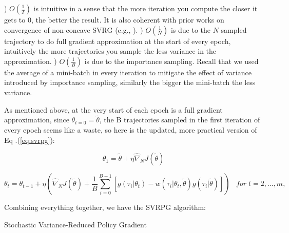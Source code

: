 ) $O(\frac{1}{T})$ is intuitive in a sense that the more iteration you compute the closer it gets to 0, the better the result. It is also coherent with prior works on convergence of non-concave SVRG (e.g., \cite{reddi2016stochastic}). ) $O(\frac{1}{N})$ is due to the $N$ sampled trajectory to do full gradient approximation at the start of every epoch, intuitively the more trajectories you sample the less variance in the approximation. ) $O(\frac{1}{B})$ is due to the importance sampling. Recall that we used the average of a mini-batch in every iteration to mitigate the effect of variance introduced by importance sampling, similarly the bigger the mini-batch the less variance.


As mentioned above, at the very start of each epoch is a full gradient approximation, since $\theta_{t=0} = \tilde{\theta}$, the B trajectories sampled in the first iteration of every epoch seems like a waste, so here is the updated, more practical version of Eq .(\ref{eq:svrpg}):

$$\theta_1 = \tilde{\theta}+\eta\widehat{\nabla}_N J(\tilde{\theta})$$

$$\theta_t = \theta_{t-1}+\eta\left(\widehat{\nabla}_N J(\tilde{\theta})+\frac{1}{B}\sum_{i=0}^{B-1}\left[g(\tau_i|\theta_t)-w(\tau_i|\theta_t,\tilde{\theta})g(\tau_i|\tilde{\theta}) \right]\right) \;\;\;for \;t=2,\ldots,m,$$

Combining everything together, we have the SVRPG algorithm:
\begin{algorithm}
  \caption{Stochastic Variance-Reduced Policy Gradient}\label{algo1}
\end{algorithm}